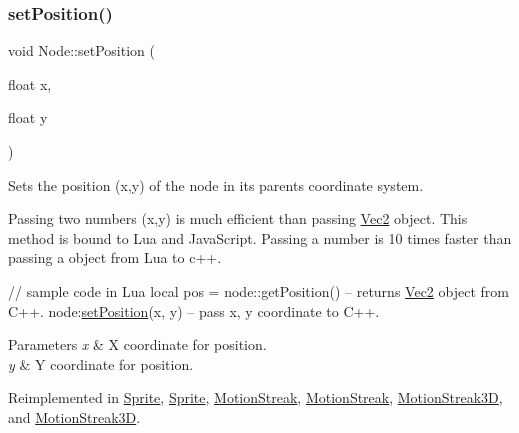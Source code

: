 \mbox{\label{classNode_aaa8545c103ef1b35e5076dbedab93af5}} 
\subsubsection{\texorpdfstring{set\+Position()}{setPosition()}\hspace{0.1cm}{\footnotesize\ttfamily [3/4]}}
{\footnotesize\ttfamily void Node\+::set\+Position (\begin{DoxyParamCaption}\item[{float}]{x,  }\item[{float}]{y }\end{DoxyParamCaption})\hspace{0.3cm}{\ttfamily [virtual]}}

Sets the position (x,y) of the node in its parent\textquotesingle{}s coordinate system.

Passing two numbers (x,y) is much efficient than passing \hyperlink{classVec2}{Vec2} object. This method is bound to Lua and Java\+Script. Passing a number is 10 times faster than passing a object from Lua to c++.


\begin{DoxyCode}
\textcolor{comment}{// sample code in Lua}
local pos  = node::getPosition()  -- returns \hyperlink{classVec2}{Vec2} \textcolor{keywordtype}{object} from C++.
node:\hyperlink{classNode_a8ffbf25763ef5f15eeae7227779505bc}{setPosition}(x, y)            -- pass x, y coordinate to C++.
\end{DoxyCode}



\begin{DoxyParams}{Parameters}
{\em x} & X coordinate for position. \\
\hline
{\em y} & Y coordinate for position. \\
\hline
\end{DoxyParams}


Reimplemented in \hyperlink{classSprite_aaef708324799384499b67c1721ad36d1}{Sprite}, \hyperlink{classSprite_ad6ceb4be9c4664798908bb0f8dd3bf70}{Sprite}, \hyperlink{classMotionStreak_a5aee78ffa74f687a09d9167b8da6d075}{Motion\+Streak}, \hyperlink{classMotionStreak_a8799ee17a6842cad944b85d67f1155d0}{Motion\+Streak}, \hyperlink{classMotionStreak3D_af19878b923b0caae1704f93a9ee21699}{Motion\+Streak3D}, and \hyperlink{classMotionStreak3D_ada67cecb8a81f0f48615d24eb9fc2373}{Motion\+Streak3D}.

